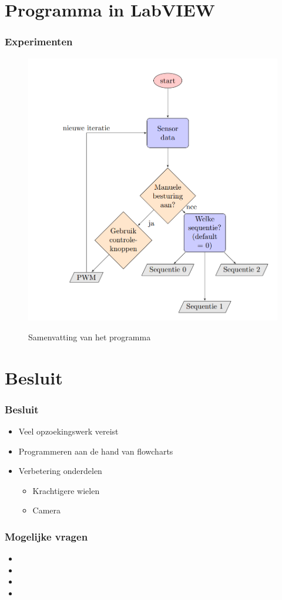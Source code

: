 \documentclass
   [kulak] %
   {kulakbeamer}
\begin{document}
\section[Programma]{Programma in LabVIEW}

\begin{frame}
	\frametitle{Experimenten}
	\begin{figure}
		\centering
		\includegraphics[width=.7\textwidth]{flowchartBegin}
		\caption{Samenvatting van het programma}\cite{}
	\end{figure}
\end{frame}



\section{Besluit}
\begin{frame}
\frametitle{Besluit}
	\begin{itemize}
	\item Veel opzoekingswerk vereist
	\item Programmeren aan de hand van flowcharts
	\item Verbetering onderdelen
		\begin{itemize}
		\item Krachtigere wielen
		\item Camera
		\end{itemize}
\end{itemize}
\end{frame}


\begin{frame}
\frametitle{Mogelijke vragen}
	\begin{itemize}
		\item 
		\item 
		\item 
		\item 
	\end{itemize}
\end{frame}
\end{document}
